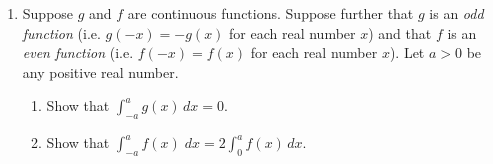 \documentclass[12pt,fleqn]{article}
\begin{document}
\begin{enumerate}
\item Suppose $g$ and $f$ are continuous functions.  Suppose further that $g$ is an \emph{odd function} (i.e. $g(-x)=-g(x)$ for each real number $x$) and that $f$ is an \emph{even function} (i.e. $f(-x)=f(x)$ for each real number $x$).  Let $a>0$ be any positive real number. 
\begin{enumerate}
	\item  Show that $\displaystyle\int_{-a}^ag(x)\,dx=0$.

\vfill

	\item Show that $\displaystyle\int_{-a}^af(x)\;dx=2\int_{0}^af(x)\,dx$.
\end{enumerate} 
\end{enumerate}

\vfill
\end{document}
